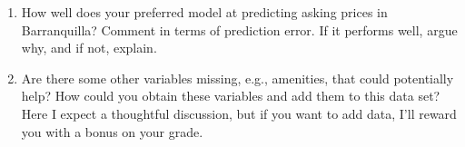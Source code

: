 \documentclass[12pt,onecolumn]{article}
\begin{document}
\begin{enumerate}
\item How well does your preferred model at predicting asking prices in Barranquilla? Comment in terms of prediction error. If it performs well, argue why, and if not, explain.

\item Are there some other variables missing, e.g., amenities, that could potentially help? How could you obtain these variables and add them to this data set? Here I expect a thoughtful discussion, but if you want to add data, I'll reward you with a bonus on your grade. 

  
\end{enumerate}
\end{document}
